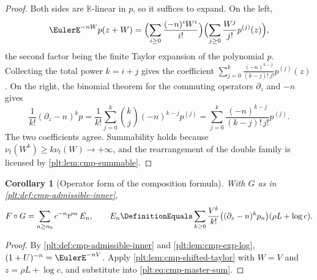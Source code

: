 \documentclass[11pt,oneside]{article}
\theoremstyle{plain}
\newtheorem{corollary}[theorem]{Corollary}
\theoremstyle{definition}
\theoremstyle{remark}
\newcommand{\K}{\mathbb{K}}
\newcommand{\ordt}{\nu_{t}}                              %
\newcommand{\compose}{\mathbin{\circ}}
\begin{document}
\begin{proof}
Both sides are \(\K\)-linear in \(p\), so it suffices to expand.  On the left,
\[
 \EulerE^{-nW}p(z+W)
 =\Bigl(\sum_{i\ge0}\frac{(-n)^{i}W^{i}}{i!}\Bigr)
  \Bigl(\sum_{j\ge0}\frac{W^{j}}{j!}p^{(j)}(z)\Bigr),
\]
the second factor being the finite Taylor expansion of the polynomial \(p\).
Collecting the total power \(k=i+j\) gives the coefficient
\(\sum_{j=0}^{k}\frac{(-n)^{k-j}}{(k-j)!\,j!}p^{(j)}(z)\).  On the right, the
binomial theorem for the commuting operators \(\partial_z\) and \(-n\) gives
\[
 \frac{1}{k!}(\partial_z-n)^{k}p
 =\frac{1}{k!}\sum_{j=0}^{k}\binom{k}{j}(-n)^{k-j}p^{(j)}
 =\sum_{j=0}^{k}\frac{(-n)^{k-j}}{(k-j)!\,j!}p^{(j)} .
\]
The two coefficients agree.  Summability holds because
\(\ordt(W^{k})\ge k\ordt(W)\to+\infty\), and the rearrangement of the double
family is licensed by \cref{plt:lem:cmp-summable}.
\end{proof}

\begin{corollary}[Operator form of the composition formula]
\label{plt:cor:cmp-operator-form}
With \(G\) as in \cref{plt:def:cmp-admissible-inner},
\begin{equation}\label{plt:eq:cmp-operator-form}
 F\compose G
 =\sum_{n\ge n_0}c^{-n}t^{\rho n}\,E_n,
 \qquad
 E_n\DefinitionEquals
 \sum_{k\ge0}\frac{V^{k}}{k!}
   \bigl((\partial_z-n)^{k}p_n\bigr)(\rho L+\log c).
\end{equation}
\end{corollary}

\begin{proof}
By \cref{plt:def:cmp-admissible-inner} and \cref{plt:lem:cmp-exp-log},
\((1+U)^{-n}=\EulerE^{-nV}\).  Apply
\cref{plt:lem:cmp-shifted-taylor} with \(W=V\) and \(z=\rho L+\log c\), and
substitute into \eqref{plt:eq:cmp-master-sum}.
\end{proof}
\end{document}
